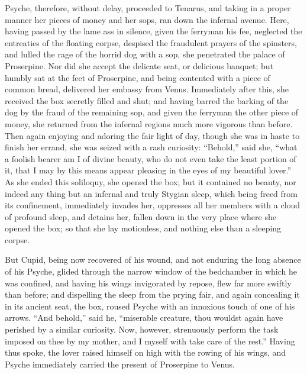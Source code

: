 \documentclass{article}
\begin{document}
Psyche, therefore, without delay, proceeded to Tenarus, and taking in a proper
manner her pieces of money and her sops, ran down the infernal avenue. Here,
having passed by the lame ass in silence, given the ferryman his fee, neglected
the entreaties of the floating corpse, despised the fraudulent prayers of the
spinsters, and lulled the rage of the horrid dog with a sop, she penetrated the
palace of Proserpine. Nor did she accept the delicate seat, or delicious
banquet; but humbly sat at the feet of Proserpine, and being contented with a
piece of common bread, delivered her embassy from Venus. Immediately after
this, she received the box secretly filled and shut; and having barred the
barking of the dog by the fraud of the remaining sop, and given the ferryman
the other piece of money, she returned from the infernal regions much more
vigorous than before. Then again enjoying and adoring the fair light of day,
though she was in haste to finish her errand, she was seized with a rash
curiosity: ``Behold,'' said she, ``what a foolish bearer am I of divine beauty,
who do not even take the least portion of it, that I may by this means appear
pleasing in the eyes of my beautiful lover.'' As she ended this soliloquy, she
opened the box; but it contained no beauty, nor indeed any thing but an
infernal and truly Stygian sleep, which being freed from its confinement,
immediately invades her, oppresses all her members with a cloud of profound
sleep, and detains her, fallen down in the very place where she opened the box;
so that she lay motionless, and nothing else than a sleeping corpse.

But Cupid, being now recovered of his wound, and not enduring the long absence
of his Psyche, glided through the narrow window of the bedchamber in which he
was confined, and having his wings invigorated by repose, flew far more swiftly
than before; and dispelling the sleep from the prying fair, and again
concealing it in its ancient seat, the box, roused Psyche with an innoxious
touch of one of his arrows. ``And behold,'' said he, ``miserable creature, thou
wouldst again have perished by a similar curiosity. Now, however, strenuously
perform the task imposed on thee by my mother, and I myself with take care of
the rest.'' Having thus spoke, the lover raised himself on high with the rowing
of his wings, and Psyche immediately carried the present of Proserpine to
Venus.
\end{document}
